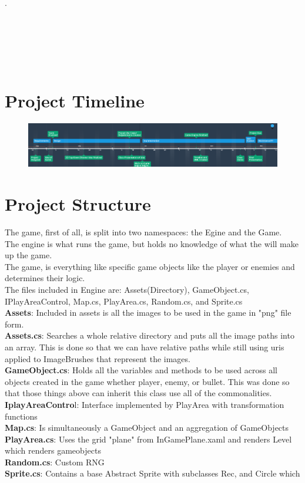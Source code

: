 \documentclass[10pt,conference,onecolumn,compsoc]{IEEEtran}
\begin{document}
.\\\\\\\\\\\\
\section{Project Timeline} 
\begin{figure}[ht!]
\includegraphics[scale=.45]{game_timeline.png}
\caption{}
\label{Timeline}
\end{figure}




\section{Project Structure}
The game, first of all, is split into two namespaces: the Egine and the Game. \\
The engine is what runs the game, but holds no knowledge of what the will make up the game.\\
The game, is everything like specific game objects like the player or enemies and determines their logic.\\

The files included in Engine are: Assets(Directory), GameObject.cs, IPlayAreaControl, Map.cs, PlayArea.cs, Random.cs, and Sprite.cs\\

\textbf{Assets}: Included in assets is all the images to be used in the game in "png" file form. \\
\textbf{Assets.cs}: Searches a whole relative directory and puts all the image paths into an array. This is done so that we can have relative
paths while still using uris applied to ImageBrushes that represent the images.\\
\textbf{GameObject.cs}: Holds all the variables and methods to be used across all objects created in the game whether player, enemy, or bullet.
This was done so that those things above can inherit this class use all of the commonalities.\\
\textbf{IplayAreaContro}l: Interface implemented by PlayArea with transformation functions\\
\textbf{Map.cs}: Is simultaneously a GameObject and an aggregation of GameObjects \\
\textbf{PlayArea.cs}: Uses the grid "plane" from InGamePlane.xaml and renders Level which renders gameobjects\\
\textbf{Random.cs}: Custom RNG\\
\textbf{Sprite.cs}: Contains a base Abstract Sprite with subclasses Rec, and Circle which\\
\end{document}
